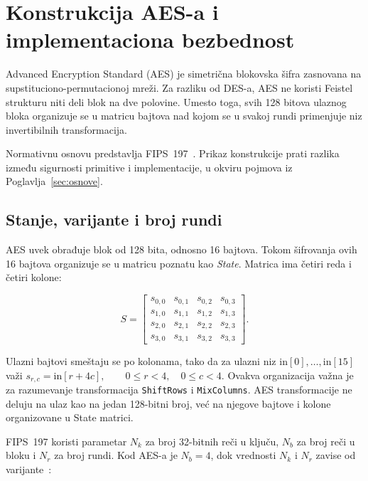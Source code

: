 \section{Konstrukcija AES-a i implementaciona bezbednost}
\label{sec:aes}

Advanced Encryption Standard (AES) je simetrična blokovska šifra
zasnovana na supstituciono-permu\-ta\-cionoj mreži. Za razliku od DES-a,
AES ne koristi Feistel strukturu niti deli blok na dve polovine.
Umesto toga, svih 128 bitova ulaznog bloka organizuje se u matricu
bajtova nad kojom se u svakoj rundi primenjuje niz invertibilnih
transformacija.

Normativnu osnovu predstavlja FIPS~197~\cite{fips197-2023}.
Prikaz konstrukcije prati razlika između sigurnosti primitive i
implementacije, u okviru pojmova iz Poglavlja~\ref{sec:osnove}.

\subsection{Stanje, varijante i broj rundi}
\label{subsec:aes_state}

AES uvek obrađuje blok od 128 bita, odnosno 16 bajtova. Tokom
šifrovanja ovih 16 bajtova organizuje se u matricu poznatu kao
\emph{State}. Matrica ima četiri reda i četiri kolone:

\begin{equation}
S =
\begin{bmatrix}
s_{0,0} & s_{0,1} & s_{0,2} & s_{0,3} \\
s_{1,0} & s_{1,1} & s_{1,2} & s_{1,3} \\
s_{2,0} & s_{2,1} & s_{2,2} & s_{2,3} \\
s_{3,0} & s_{3,1} & s_{3,2} & s_{3,3}
\end{bmatrix}.
\label{eq:aes-state}
\end{equation}

Ulazni bajtovi smeštaju se po kolonama, tako da za ulazni niz
$\mathrm{in}[0],\ldots,\mathrm{in}[15]$ važi
$s_{r,c} = \mathrm{in}[r+4c], \qquad 0\leq r<4,\quad 0\leq c<4$.
Ovakva organizacija važna je za razumevanje transformacija
\texttt{ShiftRows} i \texttt{MixColumns}. AES transformacije ne deluju
na ulaz kao na jedan 128-bitni broj, već na njegove bajtove i kolone
organizovane u State matrici.

FIPS~197 koristi parametar $N_k$ za broj 32-bitnih reči u ključu,
$N_b$ za broj reči u bloku i $N_r$ za broj rundi. Kod AES-a je
$N_b = 4$,
dok vrednosti $N_k$ i $N_r$ zavise od varijante~\cite{fips197-2023}:

